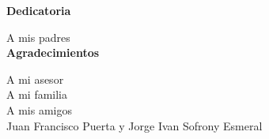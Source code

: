\newpage
    \thispagestyle{empty}
    


\begin{center}
    \textbf{Dedicatoria}%


    
   	A mis padres\\[2cm]
    
    \textbf{Agradecimientos}%
    
    A mi asesor \\
    A mi familia \\
    A mis amigos \\  
    Juan Francisco Puerta y Jorge Ivan Sofrony Esmeral    
\end{center} 




\pagestyle{empty}
\renewcommand{\contentsname}{\centerline{\normalfont\normalsize TABLA DE CONTENIDO}}
    \tableofcontents 
    
    
    
\newpage
     \pagestyle{empty}
    \renewcommand{\listtablename}{\centerline{\normalfont\normalsize LISTA DE TABLAS}}
    \listoftables
    
    
    
    
\newpage
    \thispagestyle{empty}
    
    \renewcommand{\listfigurename}{\centerline{\normalfont\normalsize LISTA DE FIGURAS}}
    \listoffigures 
    
    
    
    
\newpage
    \thispagestyle{empty}
    
